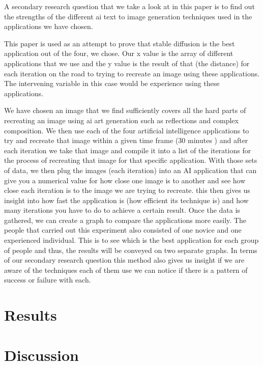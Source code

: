 \documentclass[]{report}
\begin{document}
	A secondary research question that we take a look at in this paper is to find out the strengths of the different ai text to image generation techniques used in the applications we have chosen.
	
	This paper is used as an attempt to prove that stable diffusion is the best application out of the four, we chose. Our x value is the array of different applications that we use and the y value is the result of that (the distance) for each iteration on the road to trying to recreate an image using these applications. The intervening variable in this case would be experience using these applications.
	
	We have chosen an image that we find sufficiently covers all the hard parts of recreating an image using ai art generation such as reflections and complex composition. We then use each of the four artificial intelligence applications to try and recreate that image within a given time frame (30 minutes ) and after each iteration we take that image and compile it into a list of the iterations for the process of recreating that image for that specific application. With those sets of data, we then plug the images (each iteration) into an AI application that can give you a numerical value for how close one image is to another and see how close each iteration is to the image we are trying to recreate. this then gives us insight into how fast the application is (how efficient its technique is) and how many iterations you have to do to achieve a certain result. Once the data is gathered, we can create a graph to compare the applications more easily. The people that carried out this experiment also consisted of one novice and one experienced individual. This is to see which is the best application for each group of people and thus, the results will be conveyed on two separate graphs. In terms of our secondary research question this method also gives us insight if we are aware of the techniques each of them use we can notice if there is a pattern of success or failure with each.
	
	
	
	\section{Results}
	\newpage	
	\section{Discussion}
	
\end{document}
